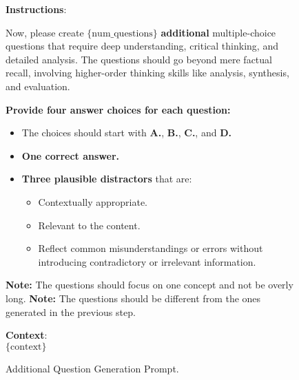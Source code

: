 \begin{figure}[h]
\centering
\begin{tcolorbox}[width=1\columnwidth, fontupper=\footnotesize,title=\BaselineMT Additional Question Generation Prompt]
\RaggedRight
\obeylines
\textbf{Instructions}: \\
{
Now, please create $\{\text{num\_questions}\}$ \textbf{additional} multiple-choice questions that require deep understanding, critical thinking, and detailed analysis.  
The questions should go beyond mere factual recall, involving higher-order thinking skills like analysis, synthesis, and evaluation.

\textbf{Provide four answer choices for each question:}
\begin{itemize}[label=-,nosep]
    \item The choices should start with \textbf{A.}, \textbf{B.}, \textbf{C.}, and \textbf{D.}
    \item \textbf{One correct answer.}
    \item \textbf{Three plausible distractors} that are:
    \begin{itemize}[label=$\bullet$,nosep]
        \item Contextually appropriate.
        \item Relevant to the content.
        \item Reflect common misunderstandings or errors without introducing contradictory or irrelevant information.
    \end{itemize}
\end{itemize}
\vspace{3mm}
\textbf{Note:} The questions should focus on one concept and not be overly long.  
\textbf{Note:} The questions should be different from the ones generated in the previous step.
}
\vspace{3mm}
\vspace{3mm}
\textbf{Context}: \\
$\{\text{context}\}$ \\

\end{tcolorbox}
\caption{\BaselineMT Additional Question Generation Prompt.}
\label{fig:baseline_large_question_generation_prompt}
\end{figure}





